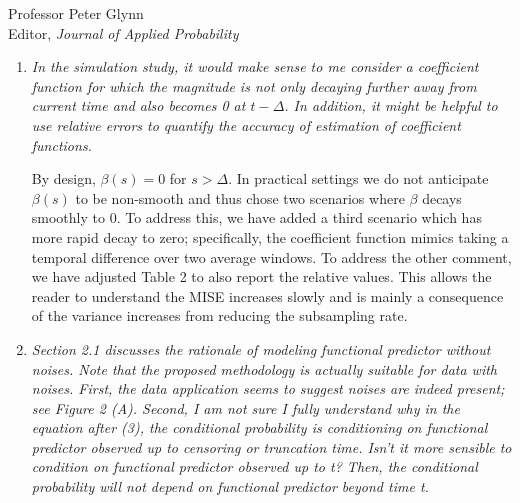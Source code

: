 \documentclass[11pt]{letter} %
\begin{document}
\begin{letter}{Professor
	Peter Glynn\\
	Editor, {\em Journal of Applied Probability}}
\begin{enumerate}
\item {\it In the simulation study, it would make sense to me consider a coefficient function for which the magnitude is not only decaying further away from current time and also becomes 0 at $t-\Delta$. In addition, it might be helpful to use relative errors to quantify the accuracy of estimation of coefficient functions.}

\vspace{5mm}
By design, $\beta(s) = 0$ for $s > \Delta$.  In practical settings we do not anticipate~$\beta(s)$ to be non-smooth and thus chose two scenarios where $\beta$ decays smoothly to 0.  To address this, we have added a third scenario which has more rapid decay to zero; specifically, the coefficient function mimics taking a temporal difference over two average windows.   To address the other comment, we have adjusted Table 2 to also report the relative values.  This allows the reader to understand the MISE increases slowly and is mainly a consequence of the variance increases from reducing the subsampling rate.
\vspace{5mm}

\item {\it Section 2.1 discusses the rationale of modeling functional predictor without noises. Note that the proposed methodology is actually suitable for data with noises. First, the data application seems to suggest noises are indeed present; see Figure 2 (A). Second, I am not sure I fully understand why in the equation after (3), the conditional probability is conditioning on functional predictor observed up to censoring or truncation time. Isn’t it more sensible to condition on functional predictor observed up to t? Then, the conditional probability will not depend on functional predictor beyond time t.}


\end{enumerate}
\end{letter}
\end{document}

